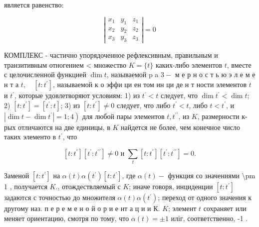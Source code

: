 \documentclass[10pt]{article}
\begin{document}
является равенство:



\[

\left|\begin{array}{lll}

x_{1} & y_{1} & z_{1} \\

x_{2} & y_{2} & z_{2} \\

x_{3} & y_{3} & z_{3}

\end{array}\right|=0

\]



КОМПЛЕКС - частично упорядоченное рефлексивным, правильным и транзитивным отногением < множество $K=\{t\}$ каких-либо элементов $t$, вместе с целочисленной функцией $\operatorname{dim} t$, называемой $\mathrm{p}$ a $3-$ м е р н о с т ь ю э л е м е н т а $t, \quad\left[t: t^{\prime}\right]$, называемой к о эффи ци ен том ин ци де н т ности элементов $t$ и $t^{\prime}$, которые удовлетворяют условиям: 1) из $t^{\prime}<t$ следует, что $\operatorname{dim} t^{\prime}<\operatorname{dim} t$; 2) $\left[t: t^{\prime}\right]=\left[t^{\prime}: t\right]$; 3) из $\left[t: t^{\prime}\right] \neq 0$ следует, что либо $t^{\prime}<t$, либо $t<t^{\prime}$, и $\left.\left|\operatorname{dim} t-\operatorname{dim} t^{\prime}\right|=1 ; 4\right)$ для любой пары элементов $t, t^{\prime \prime}$, из $K$, размерности к-рых отличаются на две единицы, в $K$ найдется не более, чем конечное число таких элементо в $t^{\prime}$, что



\[

\left[t: t^{\prime}\right]\left[t^{\prime}: t^{\prime \prime}\right] \neq 0 \text { и } \sum_{t}\left[t: t^{\prime}\right]\left[t^{\prime}: t^{\prime \prime}\right]=0 .

\]



Заменой $\left[t: t^{\prime}\right]$ на $\alpha(t) \alpha\left(t^{\prime}\right)\left[t: t^{\prime}\right]$, где $\alpha(t)-$ функция со значениями \textbackslash pm 1 , получается $K$., отождествляемый с $K$; иначе говоря, инциденции $\left[t: t^{\prime}\right]$ задаются с точностью до множителя $\alpha(t) \alpha\left(t^{\prime}\right)$; переход от одного значения к другому наз. п е р е м е н о й о р и е нт а ц и и К. $K$; элемент $t$ сохраняет или меняет ориентацию, смотря по тому, что $\alpha(t)= \pm 1$ иліг, соответственно, -1 .
\end{document}
